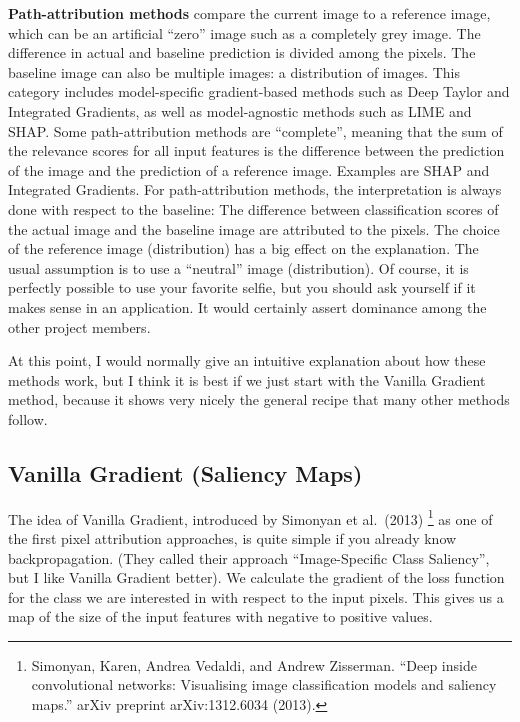 \documentclass[
  10pt,
]{scrbook}
\begin{document}
\textbf{Path-attribution methods} compare the current image to a reference image, which can be an artificial ``zero'' image such as a completely grey image.
The difference in actual and baseline prediction is divided among the pixels.
The baseline image can also be multiple images: a distribution of images.
This category includes model-specific gradient-based methods such as Deep Taylor and Integrated Gradients, as well as model-agnostic methods such as LIME and SHAP.
Some path-attribution methods are ``complete'', meaning that the sum of the relevance scores for all input features is the difference between the prediction of the image and the prediction of a reference image.
Examples are SHAP and Integrated Gradients.
For path-attribution methods, the interpretation is always done with respect to the baseline:
The difference between classification scores of the actual image and the baseline image are attributed to the pixels.
The choice of the reference image (distribution) has a big effect on the explanation.
The usual assumption is to use a ``neutral'' image (distribution).
Of course, it is perfectly possible to use your favorite selfie, but you should ask yourself if it makes sense in an application.
It would certainly assert dominance among the other project members.

At this point, I would normally give an intuitive explanation about how these methods work, but I think it is best if we just start with the Vanilla Gradient method, because it shows very nicely the general recipe that many other methods follow.

\hypertarget{vanilla-gradient-saliency-maps}{%
\subsection{Vanilla Gradient (Saliency Maps)}\label{vanilla-gradient-saliency-maps}}

The idea of Vanilla Gradient, introduced by Simonyan et al.~(2013) \footnote{Simonyan, Karen, Andrea Vedaldi, and Andrew Zisserman. ``Deep inside convolutional networks: Visualising image classification models and saliency maps.'' arXiv preprint arXiv:1312.6034 (2013).} as one of the first pixel attribution approaches, is quite simple if you already know backpropagation.
(They called their approach ``Image-Specific Class Saliency'', but I like Vanilla Gradient better).
We calculate the gradient of the loss function for the class we are interested in with respect to the input pixels.
This gives us a map of the size of the input features with negative to positive values.
\end{document}
